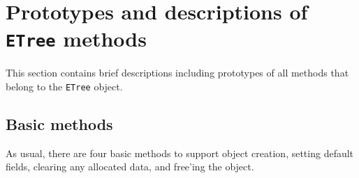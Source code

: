 \par
\section{Prototypes and descriptions of {\tt ETree} methods}
\label{section:ETree:proto}
\par
This section contains brief descriptions including prototypes
of all methods that belong to the {\tt ETree} object.
\par
\subsection{Basic methods}
\label{subsection:ETree:proto:basics}
\par
As usual, there are four basic methods to support object creation,
setting default fields, clearing any allocated data, and free'ing
the object.
\par
